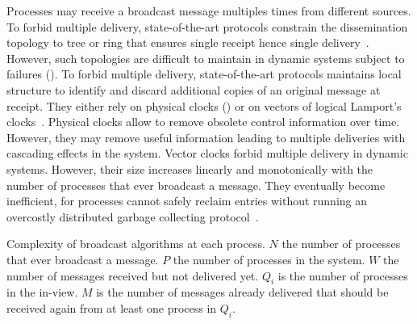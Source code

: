 Processes may receive a broadcast message multiples times from different
sources.  To forbid multiple delivery, state-of-the-art protocols constrain the
dissemination topology to tree or ring that ensures single receipt hence single
delivery~\cite{bravo2017saturn,raynal2013distributed}. However, such topologies
are difficult to maintain in dynamic systems subject to failures (\REF). To
forbid multiple delivery, state-of-the-art protocols maintains local structure
to identify and discard additional copies of an original message at
receipt. They either rely on physical clocks (\REF) or on vectors of logical
Lamport's clocks~\cite{malkhi2007concise,mukund2014optimized}. Physical clocks
allow to remove obsolete control information over time. However, they may remove
useful information leading to multiple deliveries with cascading effects in the
system. Vector clocks forbid multiple delivery in dynamic systems. However,
their size increases linearly and monotonically with the number of processes
that ever broadcast a message. They eventually become inefficient, for processes
cannot safely reclaim entries without running an overcostly distributed garbage
collecting protocol~\cite{abdullahi1998garbage}.




\begin{table}
  \begin{center}
    \caption{\label{table:complexity} Complexity of broadcast algorithms at each
      process. $N$ the number of processes that ever broadcast a message. $P$
      the number of processes in the system. $W$ the number of messages received
      but not delivered yet. $Q_i$ is the number of processes in the in-view. $M$
      is the number of messages already delivered that should be received again
      from at least one process in $Q_i$.}
    
  \end{center}
\end{table}

